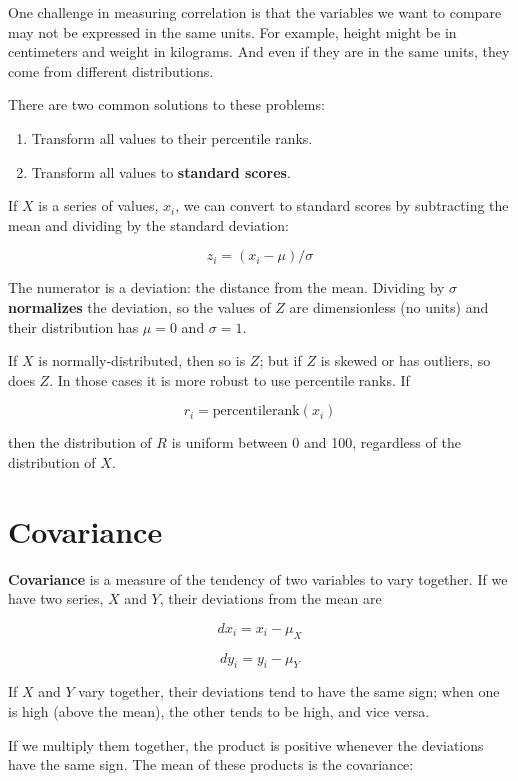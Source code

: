 \documentclass[12pt]{book}
\begin{document}
One challenge in measuring correlation is that the variables we want
to compare may not be expressed in the same units.  For example, height
might be in centimeters and weight in kilograms.  And even if they are
in the same units, they come from different distributions.

There are two common solutions to these problems:

\begin{enumerate}

\item Transform all values to their percentile ranks.

\item Transform all values to {\bf standard scores}.

\end{enumerate}

If $X$ is a series of values, $x_i$, we can convert to standard
scores by subtracting the mean and dividing by the standard deviation:

\[ z_i = (x_i - \mu) / \sigma \]

The numerator is a deviation: the distance from the mean.  Dividing by
$\sigma$ {\bf normalizes} the deviation, so the values of $Z$ are
dimensionless (no units) and their distribution has $\mu=0$ and
$\sigma=1$.

If $X$ is normally-distributed, then so is $Z$; but if $Z$ is skewed
or has outliers, so does $Z$.  In those cases it is more robust to
use percentile ranks.  If

\[ r_i = \mathrm{percentile rank} (x_i) \]

then the distribution of $R$ is uniform between 0 and 100, regardless of
the distribution of $X$.


\section{Covariance}

{\bf Covariance} is a measure of the tendency of two variables
to vary together.  If we have two series, $X$ and $Y$, their
deviations from the mean are

\[ dx_i = x_i - \mu_X \]

\[ dy_i = y_i - \mu_Y \]

If $X$ and $Y$ vary together, their deviations tend to have the
same sign; when one is high (above the mean), the other tends to be
high, and vice versa.  

If we multiply them together, the product is positive whenever the
deviations have the same sign.
The mean of these products is the covariance:
\end{document}

